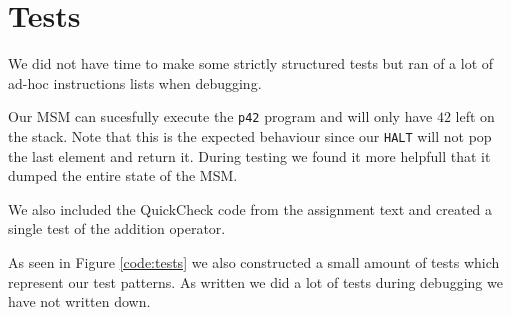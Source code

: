 \section{Tests}

We did not have time to make some strictly structured tests but ran of a lot of
ad-hoc instructions lists when debugging.

Our MSM can sucesfully execute the \texttt{p42} program and will only have $42$
left on the stack. Note that this is the expected behaviour since our
\texttt{HALT} will not pop the last element and return it. During testing we
found it more helpfull that it dumped the entire state of the MSM.

We also included the QuickCheck code from the assignment text and created a
single test of the addition operator.


As seen in Figure \ref{code:tests} we also constructed a small amount of tests
which represent our test patterns. As written we did a lot of tests during
debugging we have not written down.

